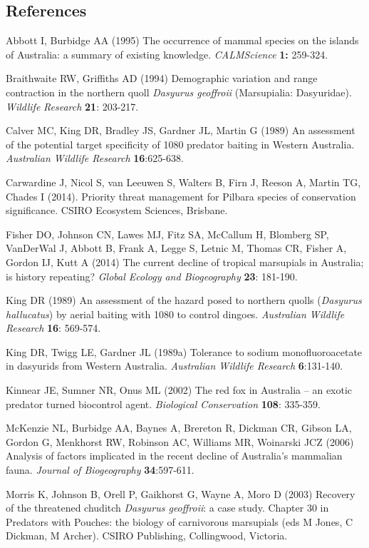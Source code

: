 \documentclass[version=last,
    paper=a4,                               %
    10pt,                                   %
    dvipsnames,
    oneside,                              %
    headings=openany,                       %
    open=any,
    BCOR=7mm,                               %
    DIV=15,     %
]{scrbook}
\begin{document}
\subsection*{References}

Abbott I, Burbidge AA (1995) The occurrence of mammal species on the
islands of Australia: a summary of existing knowledge.
\emph{CALMScience} \textbf{1:} 259-324.

Braithwaite RW, Griffiths AD (1994) Demographic variation and range
contraction in the northern quoll \emph{Dasyurus geoffroii}
(Marsupialia: Dasyuridae). \emph{Wildlife} \emph{Research} \textbf{21}:
203-217.

Calver MC, King DR, Bradley JS, Gardner JL, Martin G (1989) An
assessment of the potential target specificity of 1080 predator baiting
in Western Australia. \emph{Australian Wildlife Research}
\textbf{16}:625-638.

Carwardine J, Nicol S, van Leeuwen S, Walters B, Firn J, Reeson A,
Martin TG, Chades I (2014). Priority threat management for Pilbara
species of conservation significance. CSIRO Ecosystem Sciences,
Brisbane.

Fisher DO, Johnson CN, Lawes MJ, Fitz SA, McCallum H, Blomberg SP,
VanDerWal J, Abbott B, Frank A, Legge S, Letnic M, Thomas CR, Fisher A,
Gordon IJ, Kutt A (2014) The current decline of tropical marsupials in
Australia; is history repeating? \emph{Global Ecology and Biogeography}
\textbf{23}: 181-190.

King DR (1989) An assessment of the hazard posed to northern quolls
(\emph{Dasyurus hallucatus}) by aerial baiting with 1080 to control
dingoes. \emph{Australian Wildlife Research} \textbf{16}: 569-574.

King DR, Twigg LE, Gardner JL (1989a) Tolerance to sodium
monofluoroacetate in dasyurids from Western Australia. \emph{Australian
Wildlife Research} \textbf{6}:131-140.

Kinnear JE, Sumner NR, Onus ML (2002) The red fox in Australia -- an
exotic predator turned biocontrol agent. \emph{Biological Conservation}
\textbf{108}: 335-359.

McKenzie NL, Burbidge AA, Baynes A, Brereton R, Dickman CR, Gibson LA,
Gordon G, Menkhorst RW, Robinson AC, Williams MR, Woinarski JCZ (2006)
Analysis of factors implicated in the recent decline of Australia's
mammalian fauna. \emph{Journal of Biogeography} \textbf{34}:597-611.

Morris K, Johnson B, Orell P, Gaikhorst G, Wayne A, Moro D (2003)
Recovery of the threatened chuditch \emph{Dasyurus geoffroii}: a case
study. Chapter 30 in Predators with Pouches: the biology of carnivorous
marsupials (eds M Jones, C Dickman, M Archer). CSIRO Publishing,
Collingwood, Victoria.
\end{document}
